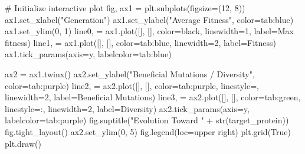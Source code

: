 \documentclass[
  letterpaper,
  DIV=11,
  numbers=noendperiod]{scrreprt}
\newenvironment{Shaded}{\begin{snugshade}}{\end{snugshade}}
\newcommand{\BuiltInTok}[1]{\textcolor[rgb]{0.00,0.23,0.31}{#1}}
\newcommand{\CommentTok}[1]{\textcolor[rgb]{0.37,0.37,0.37}{#1}}
\newcommand{\DecValTok}[1]{\textcolor[rgb]{0.68,0.00,0.00}{#1}}
\newcommand{\NormalTok}[1]{\textcolor[rgb]{0.00,0.23,0.31}{#1}}
\newcommand{\OperatorTok}[1]{\textcolor[rgb]{0.37,0.37,0.37}{#1}}
\newcommand{\StringTok}[1]{\textcolor[rgb]{0.13,0.47,0.30}{#1}}
\newcommand{\VariableTok}[1]{\textcolor[rgb]{0.07,0.07,0.07}{#1}}
\theoremstyle{definition}
\theoremstyle{remark}
\begin{document}
\begin{tcolorbox}
\begin{Shaded}
\begin{Highlighting}[]
\CommentTok{\# Initialize interactive plot}
\NormalTok{fig, ax1 }\OperatorTok{=}\NormalTok{ plt.subplots(figsize}\OperatorTok{=}\NormalTok{(}\DecValTok{12}\NormalTok{, }\DecValTok{8}\NormalTok{))}
\NormalTok{ax1.set\_xlabel(}\StringTok{"Generation"}\NormalTok{)}
\NormalTok{ax1.set\_ylabel(}\StringTok{"Average Fitness"}\NormalTok{, color}\OperatorTok{=}\StringTok{\textquotesingle{}tab:blue\textquotesingle{}}\NormalTok{)}
\NormalTok{ax1.set\_ylim(}\DecValTok{0}\NormalTok{, }\DecValTok{1}\NormalTok{)}
\NormalTok{line0, }\OperatorTok{=}\NormalTok{ ax1.plot([], [], color}\OperatorTok{=}\StringTok{\textquotesingle{}black\textquotesingle{}}\NormalTok{, linewidth}\OperatorTok{=}\DecValTok{1}\NormalTok{, label}\OperatorTok{=}\StringTok{\textquotesingle{}Max fitness\textquotesingle{}}\NormalTok{)}
\NormalTok{line1, }\OperatorTok{=}\NormalTok{ ax1.plot([], [], color}\OperatorTok{=}\StringTok{\textquotesingle{}tab:blue\textquotesingle{}}\NormalTok{, linewidth}\OperatorTok{=}\DecValTok{2}\NormalTok{, label}\OperatorTok{=}\StringTok{\textquotesingle{}Fitness\textquotesingle{}}\NormalTok{)}
\NormalTok{ax1.tick\_params(axis}\OperatorTok{=}\StringTok{\textquotesingle{}y\textquotesingle{}}\NormalTok{, labelcolor}\OperatorTok{=}\StringTok{\textquotesingle{}tab:blue\textquotesingle{}}\NormalTok{)}

\NormalTok{ax2 }\OperatorTok{=}\NormalTok{ ax1.twinx()}
\NormalTok{ax2.set\_ylabel(}\StringTok{"Beneficial Mutations / Diversity"}\NormalTok{, color}\OperatorTok{=}\StringTok{\textquotesingle{}tab:purple\textquotesingle{}}\NormalTok{)}
\NormalTok{line2, }\OperatorTok{=}\NormalTok{ ax2.plot([], [], color}\OperatorTok{=}\StringTok{\textquotesingle{}tab:purple\textquotesingle{}}\NormalTok{, linestyle}\OperatorTok{=}\StringTok{\textquotesingle{}{-}{-}\textquotesingle{}}\NormalTok{, linewidth}\OperatorTok{=}\DecValTok{2}\NormalTok{, label}\OperatorTok{=}\StringTok{\textquotesingle{}Beneficial Mutations\textquotesingle{}}\NormalTok{)}
\NormalTok{line3, }\OperatorTok{=}\NormalTok{ ax2.plot([], [], color}\OperatorTok{=}\StringTok{\textquotesingle{}tab:green\textquotesingle{}}\NormalTok{, linestyle}\OperatorTok{=}\StringTok{\textquotesingle{}:\textquotesingle{}}\NormalTok{, linewidth}\OperatorTok{=}\DecValTok{2}\NormalTok{, label}\OperatorTok{=}\StringTok{\textquotesingle{}Diversity\textquotesingle{}}\NormalTok{)}
\NormalTok{ax2.tick\_params(axis}\OperatorTok{=}\StringTok{\textquotesingle{}y\textquotesingle{}}\NormalTok{, labelcolor}\OperatorTok{=}\StringTok{\textquotesingle{}tab:purple\textquotesingle{}}\NormalTok{)}
\NormalTok{fig.suptitle(}\StringTok{"Evolution Toward "} \OperatorTok{+} \BuiltInTok{str}\NormalTok{(target\_protein))}
\NormalTok{fig.tight\_layout()}
\NormalTok{ax2.set\_ylim(}\DecValTok{0}\NormalTok{, }\DecValTok{5}\NormalTok{)}
\NormalTok{fig.legend(loc}\OperatorTok{=}\StringTok{\textquotesingle{}upper right\textquotesingle{}}\NormalTok{)}
\NormalTok{plt.grid(}\VariableTok{True}\NormalTok{)}
\NormalTok{plt.draw()}


\end{Highlighting}
\end{Shaded}
\end{tcolorbox}
\end{document}
